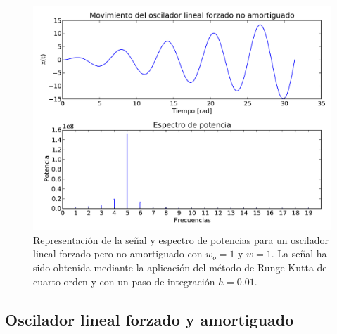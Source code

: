 \documentclass[11pt]{article}
\begin{document}
\begin{figure}[h]
\centering
\includegraphics[width=0.75\linewidth]{caso_forzado.pdf}
\caption{Representación de la señal y espectro de potencias para un oscilador lineal forzado pero no amortiguado con $w_o = 1$ y $w = 1$. La señal ha sido obtenida mediante la aplicación del método de Runge-Kutta de cuarto orden y con un paso de integración $h = 0.01$.}
\label{fig:caso_forzado}
\end{figure}

\subsection{Oscilador lineal forzado y amortiguado}
\end{document}
